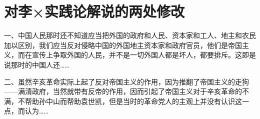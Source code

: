 \section[对李×实践论解说的两处修改（一九五二年三月）]{对李×实践论解说的两处修改}


一、中国人民那时还不知道应当把外国的政府和人民、资本家和工人、地主和农民加以区别，我们应当反对侵略中国的外国地主资本家和政府官员，他们是帝国主义，而在宣传上争取外国的人民，并不是一切外国人都是坏人，都要排斥。这即是说那时的中国人还……

二、虽然辛亥革命实际上起了反对帝国主义的作用，因为推翻了帝国主义的走狗——满清政府，当然就带有反帝的作用，因而引起了帝国主义对于辛亥革命的不满，不帮助孙中山而帮助袁世凯，但是当时的革命党人的主观上并没有认识这一点，而认为……


